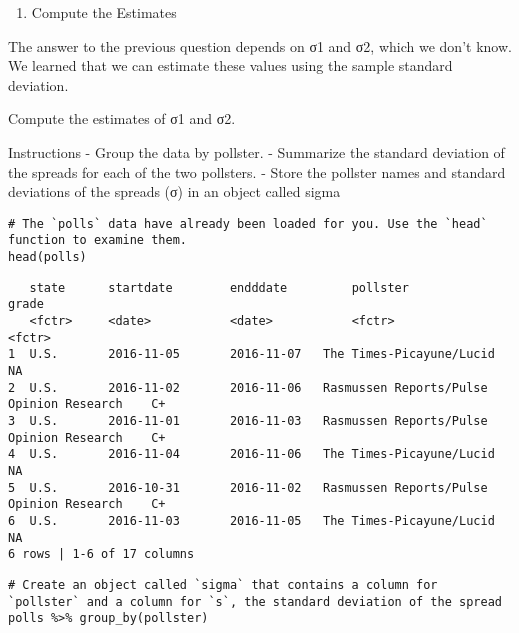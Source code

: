 \documentclass[
]{article}
\providecommand{\tightlist}{%
  \setlength{\itemsep}{0pt}\setlength{\parskip}{0pt}}
\begin{document}
\begin{enumerate}
\def\labelenumi{\arabic{enumi}.}
\setcounter{enumi}{12}
\tightlist
\item
  Compute the Estimates
\end{enumerate}

The answer to the previous question depends on σ1 and σ2, which we don't
know. We learned that we can estimate these values using the sample
standard deviation.

Compute the estimates of σ1 and σ2.

Instructions - Group the data by pollster. - Summarize the standard
deviation of the spreads for each of the two pollsters. - Store the
pollster names and standard deviations of the spreads (σ) in an object
called sigma

\begin{verbatim}
# The `polls` data have already been loaded for you. Use the `head` function to examine them.
head(polls)
\end{verbatim}

\begin{verbatim}
   state      startdate        endddate         pollster                                        grade     
   <fctr>     <date>           <date>           <fctr>                                          <fctr>
1  U.S.       2016-11-05       2016-11-07   The Times-Picayune/Lucid                    NA  
2  U.S.       2016-11-02       2016-11-06   Rasmussen Reports/Pulse Opinion Research    C+  
3  U.S.       2016-11-01       2016-11-03   Rasmussen Reports/Pulse Opinion Research    C+  
4  U.S.       2016-11-04       2016-11-06   The Times-Picayune/Lucid                    NA  
5  U.S.       2016-10-31       2016-11-02   Rasmussen Reports/Pulse Opinion Research    C+  
6  U.S.       2016-11-03       2016-11-05   The Times-Picayune/Lucid                    NA  
6 rows | 1-6 of 17 columns
\end{verbatim}

\begin{verbatim}
# Create an object called `sigma` that contains a column for `pollster` and a column for `s`, the standard deviation of the spread
polls %>% group_by(pollster)
\end{verbatim}
\end{document}
